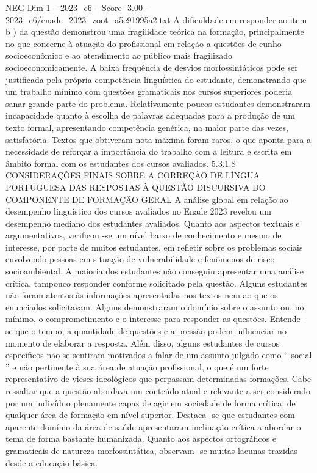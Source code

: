 \begin{textsample}{NEG Dim 1 – 2023\_c6 – Score -3.00 – 2023\_c6/enade\_2023\_zoot\_a5e91995a2.txt}
A dificuldade em responder ao item b ) da questão demonstrou uma fragilidade teórica na formação, principalmente no que concerne à atuação do profissional em relação a questões de cunho socioeconômico e ao atendimento ao público mais fragilizado socioeconomicamente.
A baixa frequência de desvios morfossintáticos pode ser justificada pela própria competência linguística do estudante, demonstrando que um trabalho mínimo com questões gramaticais nos cursos superiores poderia sanar grande parte do problema.
Relativamente poucos estudantes demonstraram incapacidade quanto à escolha de palavras adequadas para a produção de um texto formal, apresentando competência genérica, na maior parte das vezes, satisfatória.
Textos que obtiveram nota máxima foram raros, o que aponta para a necessidade de reforçar a importância do trabalho com a leitura e escrita em âmbito formal com os estudantes dos cursos avaliados. 5.3.1.8 CONSIDERAÇÕES FINAIS SOBRE A CORREÇÃO DE LÍNGUA PORTUGUESA DAS RESPOSTAS À QUESTÃO DISCURSIVA DO COMPONENTE DE FORMAÇÃO GERAL A análise global em relação ao desempenho linguístico dos cursos avaliados no Enade 2023 revelou um desempenho mediano dos estudantes avaliados.
Quanto aos aspectos textuais e argumentativos, verificou -se um nível baixo de conhecimento e mesmo de interesse, por parte de muitos estudantes, em refletir sobre os problemas sociais envolvendo pessoas em situação de vulnerabilidade e fenômenos de risco socioambiental.
A maioria dos estudantes não conseguiu apresentar uma análise crítica, tampouco responder conforme solicitado pela questão.
Alguns estudantes não foram atentos às informações apresentadas nos textos nem ao que os enunciados solicitavam.
Alguns demonstraram o domínio sobre o assunto ou, no mínimo, o comprometimento e o interesse para responder as questões.
Entende -se que o tempo, a quantidade de questões e a pressão podem influenciar no momento de elaborar a resposta.
Além disso, alguns estudantes de cursos específicos não se sentiram motivados a falar de um assunto julgado como “ social ” e não pertinente à sua área de atuação profissional, o que é um forte representativo de vieses ideológicos que perpassam determinadas formações.
Cabe ressaltar que a questão abordava um conteúdo atual e relevante a ser considerado por um indivíduo plenamente capaz de agir em sociedade de forma crítica, de qualquer área de formação em nível superior.
Destaca -se que estudantes com aparente domínio da área de saúde apresentaram inclinação crítica a abordar o tema de forma bastante humanizada.
Quanto aos aspectos ortográficos e gramaticais de natureza morfossintática, observam -se muitas lacunas trazidas desde a educação básica.

\end{textsample}
